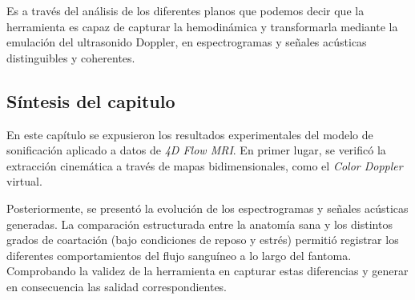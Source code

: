 Es a través del análisis de los diferentes planos que podemos decir que la herramienta es capaz de capturar la hemodinámica y transformarla mediante la emulación del ultrasonido Doppler, en espectrogramas y señales acústicas distinguibles y coherentes.

\subsection{Síntesis del capitulo}
En este capítulo se expusieron los resultados experimentales del modelo de sonificación aplicado a datos de \textit{4D Flow MRI}. En primer lugar, se verificó la extracción cinemática a través de mapas bidimensionales, como el \textit{Color Doppler} virtual. 

Posteriormente, se presentó la evolución de los espectrogramas y señales acústicas generadas. La comparación estructurada entre la anatomía sana y los distintos grados de coartación (bajo condiciones de reposo y estrés) permitió registrar los diferentes comportamientos del flujo sanguíneo a lo largo del fantoma. Comprobando la validez de la herramienta en capturar estas diferencias y generar en consecuencia las salidad correspondientes.
